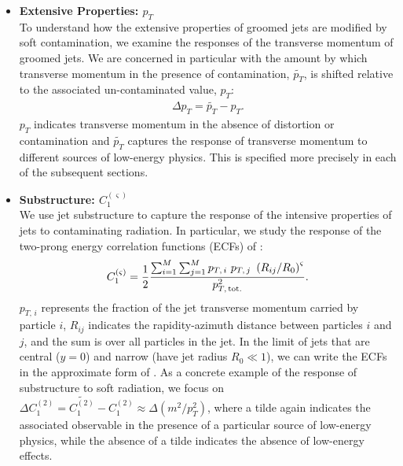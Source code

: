 \begin{subappendices}
\begin{itemize}
    \item \textbf{Extensive Properties: \(p_T\)}
    \\
    To understand how the extensive properties of groomed jets are modified by soft contamination, we examine the responses of the transverse momentum of groomed jets.
    We are concerned in particular with the amount by which transverse momentum in the presence of contamination, \(\widetilde{p_T}\), is shifted relative to the associated un-contaminated value, \(p_T\):
    \begin{align}
        \Delta p_T = \widetilde{p_T}- p_T
        .
        \label{eq:pt_response}
    \end{align}
   \(p_T\) indicates transverse momentum in the absence of distortion or contamination and \(\widetilde{p_T}\) captures the response of transverse momentum to different sources of low-energy physics.
   This is specified more precisely in each of the subsequent sections.

    \item \textbf{Substructure: \(C_1^{(\varsigma)}\)}
    \\
    We use jet substructure to capture the response of the intensive properties of jets to contaminating radiation.
    In particular, we study the response of the two-prong energy correlation functions (ECFs) of :
    \begin{equation}
        C_1^{(\varsigma)}
        =
        \frac{1}{2}\frac{\sum_{i=1}^M\sum_{j=1}^M p_{T,\,i}\ p_{T,\,j}\ \left(R_{ij}/R_0\right)^\varsigma}{p_{T,\,{\rm tot.}}^2}
        \label{eq:ECFdefn_pheno}
        .
    \end{equation}
    \(p_{T,\,i}\) represents the fraction of the jet transverse momentum carried by particle \(i\), \(R_{ij}\) indicates the rapidity-azimuth distance between particles \(i\) and \(j\), and the sum is over all particles in the jet.
    In the limit of jets that are central (\(y = 0\)) and narrow (have jet radius \(R_0 \ll 1\)), we can write the ECFs in the approximate form of .
    As a concrete example of the response of substructure to soft radiation, we focus on \(\Delta C_1^{(2)} = \widetilde{C_1^{(2)}} - C_1^{(2)} \approx \Delta\left(m^2 / p_T^2\right)\), where a tilde again indicates the associated observable in the presence of a particular source of low-energy physics, while the absence of a tilde indicates the absence of low-energy effects.
\end{itemize}


\end{subappendices}
